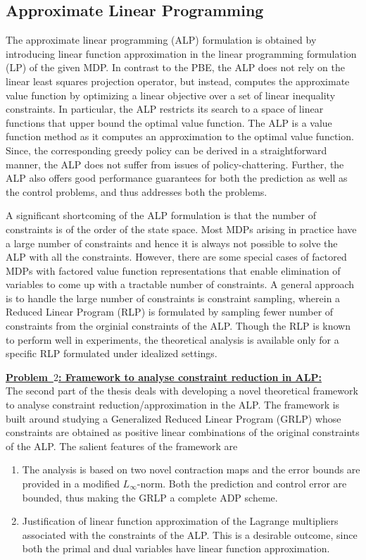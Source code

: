 \subsection{Approximate Linear Programming}
The approximate linear programming (ALP) formulation is obtained by introducing linear function approximation in the linear programming formulation (LP) of the given MDP. In contrast to the PBE, the ALP does not rely on the linear least squares projection operator, but instead, computes the approximate value function by optimizing a linear objective over a set of linear inequality constraints. In particular, the ALP restricts its search to a space of linear functions that upper bound the optimal value function. The ALP is a value function method as it computes an approximation to the optimal value function. Since, the corresponding greedy policy can be derived in a straightforward manner, the ALP does not suffer from issues of policy-chattering. Further, the ALP also offers good performance guarantees for both the prediction as well as the control problems, and thus addresses both the problems.\par
A significant shortcoming of the ALP formulation is that the number of constraints is of the order of the state space. Most MDPs arising in practice have a large number of constraints and hence it is always not possible to solve the ALP with all the constraints. However, there are some special cases of factored MDPs with factored value function representations that enable elimination of variables to come up with a tractable number of constraints. A general approach is to handle the large number of constraints is constraint sampling, wherein a Reduced Linear Program (RLP) is formulated by sampling fewer number of constraints from the orginial constraints of the ALP. Though the RLP is known to perform well in experiments, the theoretical analysis is available only for a specific RLP formulated under idealized settings.\par
\textbf{\underline{Problem~$2$: Framework to analyse constraint reduction in ALP:}}\\
The second part of the thesis deals with developing a novel theoretical framework to analyse constraint reduction/approximation in the ALP. The framework is built around studying a Generalized Reduced Linear Program (GRLP) whose constraints are obtained as positive linear combinations of the original constraints of the ALP. The salient features of the framework are
\begin{enumerate}
\item The analysis is based on two novel contraction maps and the error bounds are provided in a modified $L_\infty$-norm. Both the prediction and control error are bounded, thus making the GRLP a complete ADP scheme.
\item Justification of linear function approximation of the Lagrange multipliers associated with the constraints of the ALP. This is a desirable outcome, since both the primal and dual variables have linear function approximation.
\end{enumerate}
